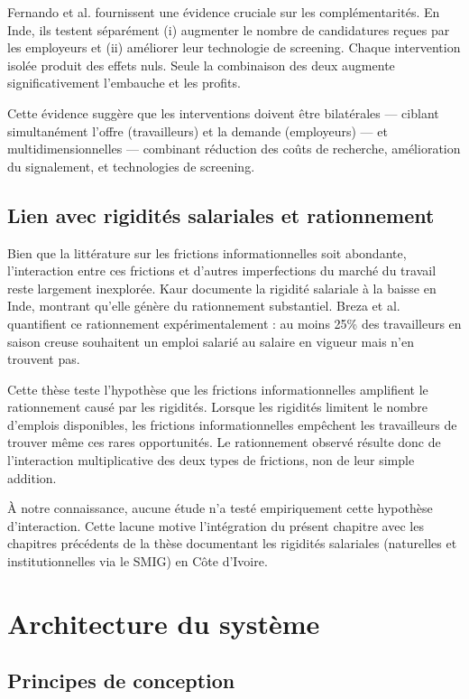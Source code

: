 \documentclass[12pt]{article}
\begin{document}
Fernando et al. \citeyearpar{fernando2023} fournissent une évidence cruciale sur les complémentarités. En Inde, ils testent séparément (i) augmenter le nombre de candidatures reçues par les employeurs et (ii) améliorer leur technologie de screening. Chaque intervention isolée produit des effets nuls. Seule la combinaison des deux augmente significativement l'embauche et les profits.

Cette évidence suggère que les interventions doivent être bilatérales — ciblant simultanément l'offre (travailleurs) et la demande (employeurs) — et multidimensionnelles — combinant réduction des coûts de recherche, amélioration du signalement, et technologies de screening.

\subsection{Lien avec rigidités salariales et rationnement}

Bien que la littérature sur les frictions informationnelles soit abondante, l'interaction entre ces frictions et d'autres imperfections du marché du travail reste largement inexplorée. Kaur \citeyearpar{kaur2019} documente la rigidité salariale à la baisse en Inde, montrant qu'elle génère du rationnement substantiel. Breza et al. \citeyearpar{breza2021} quantifient ce rationnement expérimentalement : au moins 25\% des travailleurs en saison creuse souhaitent un emploi salarié au salaire en vigueur mais n'en trouvent pas.

Cette thèse teste l'hypothèse que les frictions informationnelles amplifient le rationnement causé par les rigidités. Lorsque les rigidités limitent le nombre d'emplois disponibles, les frictions informationnelles empêchent les travailleurs de trouver même ces rares opportunités. Le rationnement observé résulte donc de l'interaction multiplicative des deux types de frictions, non de leur simple addition.

À notre connaissance, aucune étude n'a testé empiriquement cette hypothèse d'interaction. Cette lacune motive l'intégration du présent chapitre avec les chapitres précédents de la thèse documentant les rigidités salariales (naturelles et institutionnelles via le SMIG) en Côte d'Ivoire.

\section{Architecture du système}

\subsection{Principes de conception}
\end{document}
